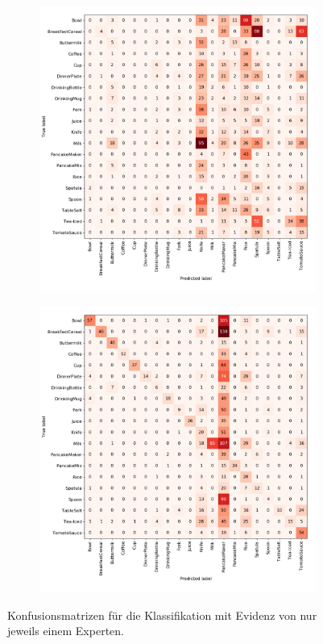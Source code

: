 \begin{figure}
\begin{subfigure}[b]{0.48\textwidth}
	\end{subfigure}
	\begin{subfigure}[b]{0.48\textwidth}
		\includegraphics[scale=.27]{img/chapter6/unrealEx1_size}	
	\end{subfigure}
	\begin{subfigure}[b]{0.48\textwidth}
		\includegraphics[scale=.27]{img/chapter6/unrealEx1_instance}	
	\end{subfigure}
\caption[Konfusionsmatrizen für die Klassifikation mit Evidenz von nur einem Experten]{Konfusionsmatrizen für die Klassifikation mit Evidenz von nur jeweils einem Experten.}
\label{fig:singleEvidences}
\end{figure}

